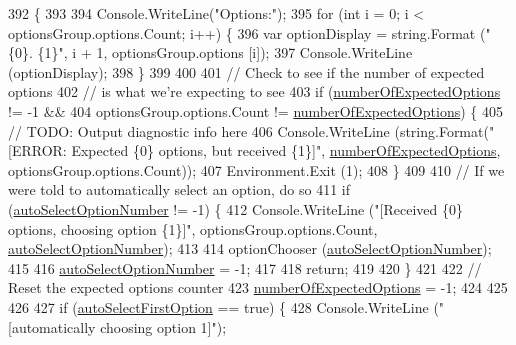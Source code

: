 \begin{DoxyCode}
392             \{
393 
394                 Console.WriteLine(\textcolor{stringliteral}{"Options:"});
395                 \textcolor{keywordflow}{for} (\textcolor{keywordtype}{int} i = 0; i < optionsGroup.options.Count; i++) \{
396                     var optionDisplay = string.Format (\textcolor{stringliteral}{"\{0\}. \{1\}"}, i + 1, optionsGroup.options [i]);
397                     Console.WriteLine (optionDisplay);
398                 \}
399 
400 
401                 \textcolor{comment}{// Check to see if the number of expected options}
402                 \textcolor{comment}{// is what we're expecting to see}
403                 \textcolor{keywordflow}{if} (\hyperlink{a00030_a2e17937195ecd64d5d867d958c45d2c3}{numberOfExpectedOptions} != -1 &&
404                     optionsGroup.options.Count != \hyperlink{a00030_a2e17937195ecd64d5d867d958c45d2c3}{numberOfExpectedOptions}) \{
405                     \textcolor{comment}{// TODO: Output diagnostic info here}
406                     Console.WriteLine (string.Format(\textcolor{stringliteral}{"[ERROR: Expected \{0\} options, but received \{1\}]"}, 
      \hyperlink{a00030_a2e17937195ecd64d5d867d958c45d2c3}{numberOfExpectedOptions}, optionsGroup.options.Count));
407                     Environment.Exit (1);
408                 \}
409 
410                 \textcolor{comment}{// If we were told to automatically select an option, do so}
411                 \textcolor{keywordflow}{if} (\hyperlink{a00030_a34886671e91a1bf3fc225eeb67baced1}{autoSelectOptionNumber} != -1) \{
412                     Console.WriteLine (\textcolor{stringliteral}{"[Received \{0\} options, choosing option \{1\}]"}, 
      optionsGroup.options.Count, \hyperlink{a00030_a34886671e91a1bf3fc225eeb67baced1}{autoSelectOptionNumber});
413 
414                     optionChooser (\hyperlink{a00030_a34886671e91a1bf3fc225eeb67baced1}{autoSelectOptionNumber});
415 
416                     \hyperlink{a00030_a34886671e91a1bf3fc225eeb67baced1}{autoSelectOptionNumber} = -1;
417 
418                     \textcolor{keywordflow}{return};
419 
420                 \}
421 
422                 \textcolor{comment}{// Reset the expected options counter}
423                 \hyperlink{a00030_a2e17937195ecd64d5d867d958c45d2c3}{numberOfExpectedOptions} = -1;
424 
425 
426 
427                 \textcolor{keywordflow}{if} (\hyperlink{a00030_a09a552ee9ff58cb3c995f8ecba1592b6}{autoSelectFirstOption} == \textcolor{keyword}{true}) \{
428                     Console.WriteLine (\textcolor{stringliteral}{"[automatically choosing option 1]"});

\end{DoxyCode}
